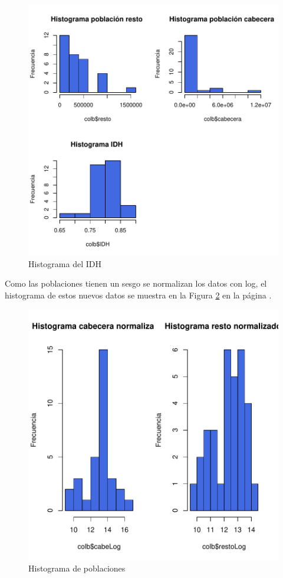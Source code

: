 \begin{figure}[h]
\centering
\includegraphics{Paper-histograma}
\caption{Histograma del IDH }
\label{histograma}
\end{figure}


Como las poblaciones tienen un sesgo se normalizan los datos con log, el histograma de estos nuevos datos se muestra en la Figura \ref{normal} en la página \pageref{normal}.

\begin{figure}[h]
\centering
\begin{adjustbox}{height=4cm}
\includegraphics{Paper-normal}
\end{adjustbox}
\caption{Histograma de poblaciones }
\label{normal}
\end{figure}


